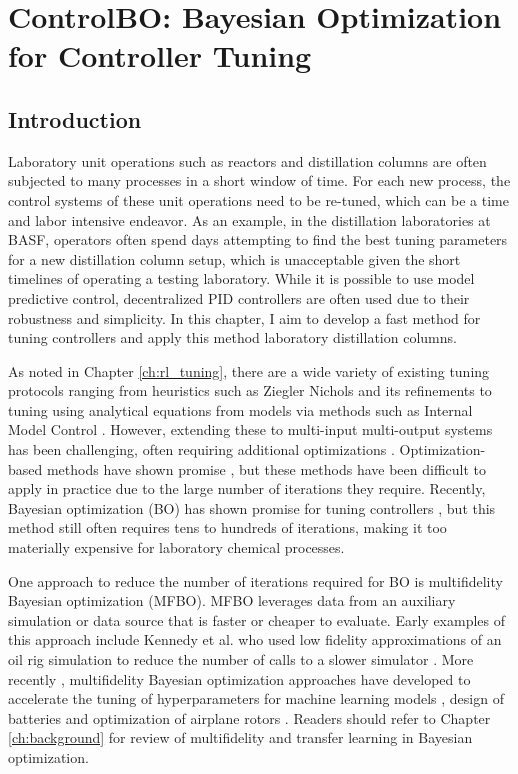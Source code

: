 \chapter{ControlBO: Bayesian Optimization for Controller Tuning}\label{ch:mfbo} 

\section{Introduction}
\label{sec:intro}
Laboratory unit operations such as reactors and distillation columns  are often subjected to many processes in a short window of time. For each new process, the control systems of these unit operations need to be re-tuned, which can be a time and labor intensive endeavor. As an example, in the distillation laboratories at BASF, operators often spend days attempting to find the best tuning parameters for a new distillation column setup, which is unacceptable given the short timelines of operating a testing laboratory. While it is possible to use model predictive control, decentralized PID controllers are often used due to their robustness and simplicity. In this chapter, I aim to develop a fast method for tuning controllers and apply this method laboratory distillation columns.

As noted in Chapter \ref{ch:rl_tuning}, there are a wide variety of existing tuning protocols ranging from heuristics such as Ziegler Nichols \cite{Ziegler1942} and its refinements \cite{Hang1991} to tuning using analytical equations from models via methods such as  Internal Model Control \cite{Copeland2010}. However, extending these to multi-input multi-output systems has been challenging, often requiring additional optimizations \cite{Nandong2013, Nandong2015}. Optimization-based methods have shown promise \cite{Pajares2019, Sumana2010, Rajapandiyan2012, Behroozsarand2012}, but these methods have been difficult to apply in practice due to the large number of iterations they require. Recently, Bayesian optimization (BO) has shown promise for tuning controllers \cite{NeumannBrosig2020, Fiducioso2019, Khosravi2020, Konig2020, Fujimoto2022, Brunzema2022, Khosravi2022}, but this method still often requires tens to hundreds of iterations, making it too materially expensive for laboratory chemical processes.

One approach to reduce the number of iterations required for BO is multifidelity Bayesian optimization (MFBO). MFBO leverages data from an auxiliary simulation or data source that is faster or cheaper to evaluate. Early examples of this approach include Kennedy et al. who used low fidelity approximations of an oil rig simulation to reduce the number of calls to a slower simulator \cite{Kennedy2000}. More recently , multifidelity Bayesian optimization approaches have developed to accelerate the tuning of hyperparameters for machine learning models \cite{pmlr-v70-kandasamy17a}, design of batteries \cite{Folch2023} and optimization of airplane rotors \cite{Pan2017}. Readers should refer to Chapter \ref{ch:background} for review of multifidelity and transfer learning in Bayesian optimization.

